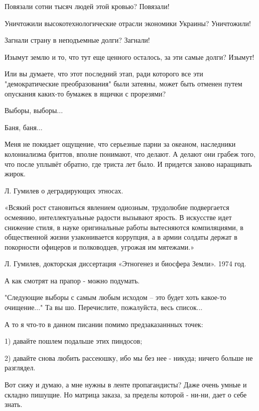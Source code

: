 \begin{itemize}
Повязали сотни тысяч людей этой кровью? Повязали!

Уничтожили высокотехнологические отрасли экономики Украины? Уничтожили!

Загнали страну в неподъемные долги? Загнали!

Изымут землю и то, что тут еще ценного осталось, за эти самые долги? Изымут!

Или вы думаете, что этот последний этап, ради которого все эти "демократические
преобразования" были затеяны, может быть отменен путем опускания каких-то
бумажек в ящички с прорезями?

Выборы, выборы...

Баня, баня...

\begin{itemize} %

Меня не покидает ощущение, что серьезные парни за океаном, наследники
колониализма бриттов, вполне понимают, что делают. А делают они грабеж того,
что после уплывёт обратно, где триста лет было. И придется заново наращивать
жирок.

\end{itemize} %


Л. Гумилев о деградирующих этносах.

«Всякий рост становиться явлением одиозным, трудолюбие подвергается осмеянию,
интеллектуальные радости вызывают ярость. В искусстве идет снижение стиля, в
науке оригинальные работы вытесняются компиляциями, в общественной жизни
узаконивается коррупция, а в армии солдаты держат в покорности офицеров и
полководцев, угрожая им мятежами.»

Л. Гумилев, докторская диссертация «Этногенез и биосфера Земли». 1974 год.

А как смотрят на прапор - можно подумать.


"Следующие выборы с самым любым исходом – это будет хоть какое-то очищение..."
Та вы шо. Перечислите, пожалуйста, весь список...

А то я что-то в данном писании помимо предзаказаннных точек:

1) давайте пошлем подальше этих пиндосов;

2) давайте снова любить рассеюшку, ибо мы без нее - никуда; ничего больше не
разглядел.

Вот сижу и думаю, а мне нужны в ленте пропагандисты? Даже очень умные и складно
пишущие. Но матрица заказа, за пределы которой - ни-ни, дает о себе знать.


\end{itemize}

